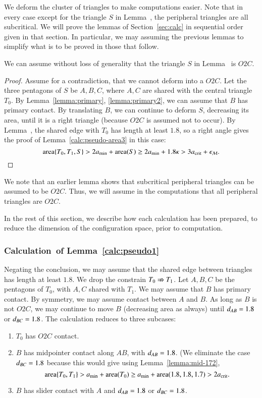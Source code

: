 We deform the cluster of triangles to make computations easier.  Note
that in every case except for the triangle $S$ in
Lemma~, the peripheral triangles are all
subcritical.  We will prove the lemmas of Section~\ref{sec:calc} in
sequential order given in that section.  In particular, we may
assuming the previous lemmas to simplify what is to be proved in those
that follow.

\begin{lemma}  
  We can assume without loss of generality that the triangle $S$ in
  Lemma~ is $O2C$.
\end{lemma}

\begin{proof} 
  Assume for a contradiction, that we cannot deform into a $O2C$.  Let
  the three pentagons of $S$ be $A,B,C$, where $A,C$ are shared with
  the central triangle $T_0$.  By Lemma~\ref{lemma:primary},
  \ref{lemma:primary2}, we can assume that $B$ has primary contact.
  By translating $B$, we can continue to deform $S$, decreasing its
  area, until it is a right triangle (because $O2C$ is assumed not to
  occur).  By Lemma~, the shared edge with $T_0$ has
  length at least $1.8$, so a right angle gives the proof of
  Lemma~\ref{calc:pseudo-area3} in this case:
\[
{\operatorname{area}}\{T_0,T_1,S\} > 2a_\text{min} + {\operatorname{area}}(S) \ge 2a_\text{min} + 1.8\kappa > 3a_\text{crit} + \epsilon_{\mathcal M}.
\]
\end{proof}


We note that an earlier lemma shows that subcritical peripheral
triangles can be assumed to be $O2C$. Thus, we will assume in the
computations that all peripheral triangles are $O2C$.

In the rest of this section, we describe how each calculation has been
prepared, to reduce the dimension of the configuration space, prior to
computation.

\subsubsection{Calculation~of Lemma~\ref{calc:pseudo1}} 
Negating the conclusion, we may assume that the shared edge between
triangles has length at least $1.8$.  We drop the constrain $T_0\nRightarrow
T_1$.  Let $A,B,C$ be the pentagons of $T_0$, with $A,C$ shared with
$T_1$. We may assume that $B$ has primary contact. By symmetry, we may
assume contact between $A$ and $B$.  As long as $B$ is not $O2C$, we
may continue to move $B$ (decreasing area as always) until
$d_{AB}=1.8$ or $d_{BC}=1.8$.  The calculation reduces to three
subcases:
\begin{enumerate}
\item $T_0$ has $O2C$ contact.
\item $B$ has midpointer contact along $AB$, with $d_{AB}=1.8$.  (We
  eliminate the case $d_{BC}=1.8$ because this would give using
  Lemma~\ref{lemma:mid-172},
\[
{\operatorname{area}}\{T_0,T_1\} > a_\text{min} + {\operatorname{area}}(T_0) \ge a_\text{min} + {\operatorname{area}}(1.8,1.8,1.7) > 2a_\text{crit}.
\]
\item $B$ has slider contact with $A$ and $d_{AB}=1.8$ or $d_{BC}=1.8$.
\end{enumerate}

